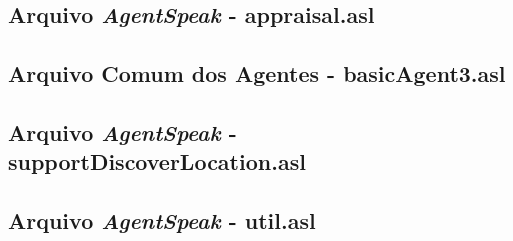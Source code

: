 \subsection*{Arquivo \emph{AgentSpeak} - appraisal.asl}


\subsection*{Arquivo Comum dos Agentes - basicAgent3.asl}


%
%
\subsection*{Arquivo \emph{AgentSpeak} - supportDiscoverLocation.asl}


\subsection*{Arquivo \emph{AgentSpeak} - util.asl}



%

%

%

